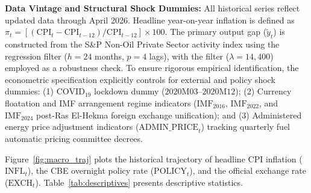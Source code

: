 \documentclass[review,12pt]{elsarticle}
\begin{document}
\textbf{Data Vintage and Structural Shock Dummies:} All historical series reflect updated data through April 2026.
Headline year-on-year inflation is defined as $\pi_t = [(\text{CPI}_t - \text{CPI}_{t-12})/\text{CPI}_{t-12}] \times 100$.
The primary output gap ($\tilde{y}_t$) is constructed from the S\&P Non-Oil Private Sector
activity index using the \citet{hamilton2018} regression filter ($h=24$ months, $p=4$ lags),
with the \citet{hodrick1997} filter ($\lambda=14{,}400$) employed as a robustness check.
To ensure rigorous empirical identification, the econometric specification explicitly controls for external and policy shock dummies:
(1) $\text{COVID}_{19}$ lockdown dummy ($2020\text{M}03$--$2020\text{M}12$);
(2) Currency floatation and IMF arrangement regime indicators ($\text{IMF}_{2016}$, $\text{IMF}_{2022}$, and $\text{IMF}_{2024}$ post-Ras El-Hekma foreign exchange unification); and
(3) Administered energy price adjustment indicators ($\text{ADMIN\_PRICE}_t$) tracking quarterly fuel automatic pricing committee decrees.

Figure~\ref{fig:macro_traj} plots the historical trajectory of headline CPI inflation ($\text{INFL}_t$),
the CBE overnight policy rate ($\text{POLICY}_t$), and the official exchange rate ($\text{EXCH}_t$).
Table~\ref{tab:descriptives} presents descriptive statistics.
\end{document}
